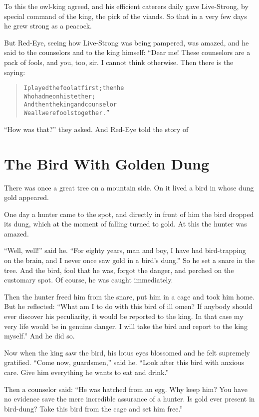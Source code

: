 \documentclass[article, twoside, 14pt]{memoir}
\renewenvironment{verbatim}{%
\begin{quote}%
\vskip -10pt%
\begin{alltt}\normalfont\large}{\end{alltt}%
\end{quote}%
\vskip -10pt
} %
\begin{document}
To this the owl-king agreed, and his efficient caterers daily gave
Live-Strong, by special command of the king, the pick of the
viands. So that in a very few days he grew strong as a peacock.

But Red-Eye, seeing how Live-Strong was being pampered, was amazed,
and he said to the counselors and to the king himself: “Dear me!
These counselors are a pack of fools, and you, too, sir. I cannot
think otherwise. Then there is the saying:

\begin{verbatim}
I played the fool at first; then he
    Who had me on his tether;
And then the king and counselor{\textemdash}
    We all were fools together.”
\end{verbatim}
``How was that?'' they asked. And Red-Eye told the story of

\chapter{The Bird With Golden Dung}

\label{s61}

There was once a great tree on a mountain side. On it lived a bird
in whose dung gold appeared.

One day a hunter came to the spot, and directly in front of him the
bird dropped its dung, which at the moment of falling turned to
gold. At this the hunter was amazed.

``Well, well!'' said he.
``For eighty years, man and boy, I have had bird-trapping on the brain, and I never once saw gold in a bird's dung.''
So he set a snare in the tree. And the bird, fool that he was,
forgot the danger, and perched on the customary spot. Of course, he
was caught immediately.

Then the hunter freed him from the snare, put him in a cage and
took him home. But he reflected:
``What am I to do with this bird of ill omen? If anybody should ever discover his peculiarity, it would be reported to the king. In that case my very life would be in genuine danger. I will take the bird and report to the king myself.''
And he did so.

Now when the king saw the bird, his lotus eyes blossomed and he
felt supremely gratified. ``Come now, guardsmen,'' said he.
``Look after this bird with anxious care. Give him everything he wants to eat and drink.''

Then a counselor said:
``He was hatched from an egg. Why keep him? You have no evidence save the mere incredible assurance of a hunter. Is gold ever present in bird-dung? Take this bird from the cage and set him free.''
\end{document}
